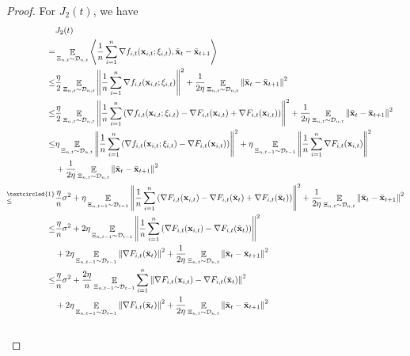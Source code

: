 \documentclass{article}
\begin{document}
\begin{proof}
For $J_2(t)$, we have
\begin{align}
\nonumber
& J_2(t) \\ \nonumber 
= & \EE_{ \Xi_{n,t} \sim \Dcal_{n,t} }\lrangle{\frac{1}{n}\sum_{i=1}^n\nabla f_{i,t}(\x_{i,t};\xi_{i,t}), \bar{\x}_t - \bar{\x}_{t+1} } \\ \nonumber
\le & \frac{\eta}{2}\EE_{ \Xi_{n,t} \sim \Dcal_{n,t} } \lrnorm{\frac{1}{n}\sum_{i=1}^n \nabla f_{i,t}(\x_{i,t};\xi_{i,t})}^2 + \frac{1}{2\eta} \EE_{ \Xi_{n,t} \sim \Dcal_{n,t} }\lrnorm{ \bar{\x}_t - \bar{\x}_{t+1}}^2  \\ \nonumber
\le & \frac{\eta}{2}\EE_{ \Xi_{n,t} \sim \Dcal_{n,t} }\lrnorm{\frac{1}{n}\sum_{i=1}^n \lrincir{\nabla  f_{i,t}(\x_{i,t};\xi_{i,t}) - \nabla F_{i,t}(\x_{i,t}) + \nabla F_{i,t}(\x_{i,t})} }^2 + \frac{1}{2\eta} \EE_{ \Xi_{n,t} \sim \Dcal_{n,t} }\lrnorm{ \bar{\x}_t - \bar{\x}_{t+1}}^2  \\ \nonumber
\le &  \eta\EE_{ \Xi_{n,t} \sim \Dcal_{n,t} }\lrnorm{\frac{1}{n}\sum_{i=1}^n \lrincir{ \nabla f_{i,t}(\x_{i,t};\xi_{i,t}) - \nabla F_{i,t}(\x_{i,t}) } }^2 + \eta \EE_{ \Xi_{n,t-1} \sim \Dcal_{t-1} }\lrnorm{\frac{1}{n}\sum_{i=1}^n\nabla F_{i,t}(\x_{i,t})}^2 \\ \nonumber 
& + \frac{1}{2\eta} \EE_{ \Xi_{n,t} \sim \Dcal_{n,t} }\lrnorm{ \bar{\x}_t - \bar{\x}_{t+1}}^2  \\ \nonumber
\refabovecir{\le}{\textcircled{1}} & \frac{\eta}{n} \sigma^2 + \eta \EE_{ \Xi_{n,t-1} \sim \Dcal_{t-1} }\lrnorm{ \frac{1}{n}\sum_{i=1}^n \lrincir{ \nabla F_{i,t}(\x_{i,t}) - \nabla F_{i,t}(\bar{\x}_t) + \nabla F_{i,t}(\bar{\x}_t) } }^2 + \frac{1}{2\eta} \EE_{ \Xi_{n,t} \sim \Dcal_{n,t} }\lrnorm{ \bar{\x}_t - \bar{\x}_{t+1}}^2 \\ \nonumber
\le & \frac{\eta}{n} \sigma^2 + 2\eta \EE_{ \Xi_{n,t-1} \sim \Dcal_{t-1} }\lrnorm{\frac{1}{n}\sum_{i=1}^n \lrincir{ \nabla F_{i,t}(\x_{i,t}) - \nabla F_{i,t}(\bar{\x}_t) } }^2 \\ \nonumber 
& + 2\eta \EE_{ \Xi_{n,t-1} \sim \Dcal_{t-1} }\lrnorm{\nabla F_{i,t}(\bar{\x}_t)}^2 + \frac{1}{2\eta} \EE_{ \Xi_{n,t} \sim \Dcal_{n,t} }\lrnorm{ \bar{\x}_t - \bar{\x}_{t+1}}^2 \\ \nonumber
\le & \frac{\eta}{n} \sigma^2 + \frac{2\eta}{n} \EE_{ \Xi_{n,t-1} \sim \Dcal_{t-1} }\sum_{i=1}^n\lrnorm{ \nabla F_{i,t}(\x_{i,t}) - \nabla F_{i,t}(\bar{\x}_t)  }^2 \\ \nonumber 
& + 2\eta \EE_{ \Xi_{n,t-1} \sim \Dcal_{t-1} }\lrnorm{\nabla F_{i,t}(\bar{\x}_t)}^2 + \frac{1}{2\eta} \EE_{ \Xi_{n,t} \sim \Dcal_{n,t} }\lrnorm{ \bar{\x}_t - \bar{\x}_{t+1}}^2 \\ \nonumber

\end{align}
\end{proof}
\end{document}
